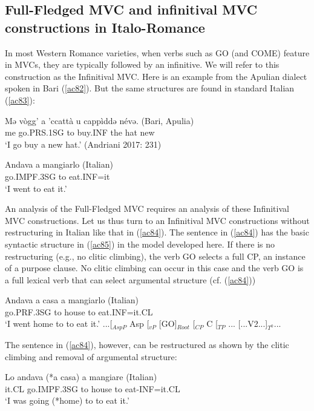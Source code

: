 \documentclass[output=paper]{langscibook}
\begin{document}
\subsection{Full-Fledged MVC and infinitival MVC constructions in Italo-Romance}

In most Western Romance varieties, when verbs such as GO (and COME) feature in MVCs, they are typically followed by an infinitive. We will refer to this construction as the Infinitival MVC. Here is an example from the Apulian dialect spoken in Bari (\ref{ac82}).  But the same structures are found in standard Italian (\ref{ac83}): 

\ea \label{ac82}\gll Mə  vògg’    a  ’ccattà  u  cappìddə  névə.   \hfill (Bari, Apulia)\\
   me  go.PRS.1SG to  buy.INF  the  hat    new {}\\
   \glt ‘I go buy a new hat.’ \hfill (Andriani 2017: 231)
\z

\ea \label{ac83}\gll Andava      a     mangiarlo      \hfill (Italian)\\
     go.IMPF.3SG   to    eat.INF=it {}\\
    \glt ‘I went to eat it.’ 
\z

An analysis of the Full-Fledged MVC requires an analysis of these Infinitival MVC constructions. Let us thus turn to an Infinitival MVC constructions without restructuring in Italian like that in (\ref{ac84}).  The sentence in (\ref{ac84}) has the basic syntactic structure in (\ref{ac85}) in the model developed here.  If there is no restructuring (e.g., no clitic climbing), the verb GO selects a full CP, an instance of a purpose clause. No clitic climbing can occur in this case and the verb GO is a full lexical verb that can select argumental structure (cf. (\ref{ac84}))

\ea \label{ac84}\gll Andava   a casa   a    mangiarlo       \hfill (Italian)\\
    go.PRF.3SG to house  to   eat.INF=it.CL\\
    \glt ‘I went home to to eat it.’
\ex \label{ac85}...[$_{AspP}$ Asp [$_{vP}$ [GO]$_{Root}$ [$_{CP}$ C [$_{TP}$ ... [...V2...]$_{T^0}$...
\z

The sentence in (\ref{ac84}), however, can be restructured as shown by the clitic climbing and removal of argumental structure:

\ea \label{ac86}\gll Lo   andava    (*a casa) a mangiare  \hfill    (Italian)\\
    it.CL go.IMPF.3SG  to house to  eat-INF=it.CL\\
    \glt ‘I was going  (*home) to to eat it.’
\z
\end{document}
